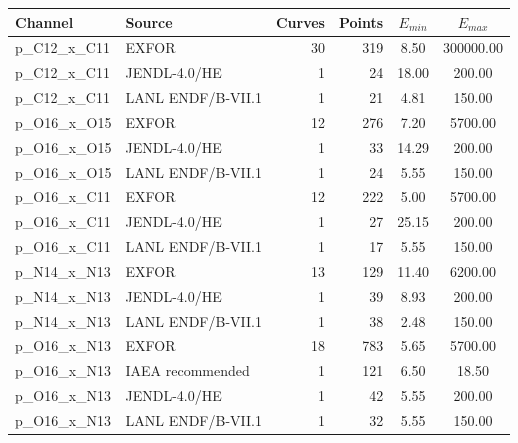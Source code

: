 \begin{tabular}{llrrcc}
\toprule
Channel & Source & Curves & Points & $E_{min}$ & $E_{max}$ \\
\midrule
p\_C12\_x\_C11 & EXFOR & 30 & 319 & 8.50 & 300000.00 \\
p\_C12\_x\_C11 & JENDL-4.0/HE & 1 & 24 & 18.00 & 200.00 \\
p\_C12\_x\_C11 & LANL ENDF/B-VII.1 & 1 & 21 & 4.81 & 150.00 \\
p\_O16\_x\_O15 & EXFOR & 12 & 276 & 7.20 & 5700.00 \\
p\_O16\_x\_O15 & JENDL-4.0/HE & 1 & 33 & 14.29 & 200.00 \\
p\_O16\_x\_O15 & LANL ENDF/B-VII.1 & 1 & 24 & 5.55 & 150.00 \\
p\_O16\_x\_C11 & EXFOR & 12 & 222 & 5.00 & 5700.00 \\
p\_O16\_x\_C11 & JENDL-4.0/HE & 1 & 27 & 25.15 & 200.00 \\
p\_O16\_x\_C11 & LANL ENDF/B-VII.1 & 1 & 17 & 5.55 & 150.00 \\
p\_N14\_x\_N13 & EXFOR & 13 & 129 & 11.40 & 6200.00 \\
p\_N14\_x\_N13 & JENDL-4.0/HE & 1 & 39 & 8.93 & 200.00 \\
p\_N14\_x\_N13 & LANL ENDF/B-VII.1 & 1 & 38 & 2.48 & 150.00 \\
p\_O16\_x\_N13 & EXFOR & 18 & 783 & 5.65 & 5700.00 \\
p\_O16\_x\_N13 & IAEA recommended & 1 & 121 & 6.50 & 18.50 \\
p\_O16\_x\_N13 & JENDL-4.0/HE & 1 & 42 & 5.55 & 200.00 \\
p\_O16\_x\_N13 & LANL ENDF/B-VII.1 & 1 & 32 & 5.55 & 150.00 \\
\bottomrule
\end{tabular}
